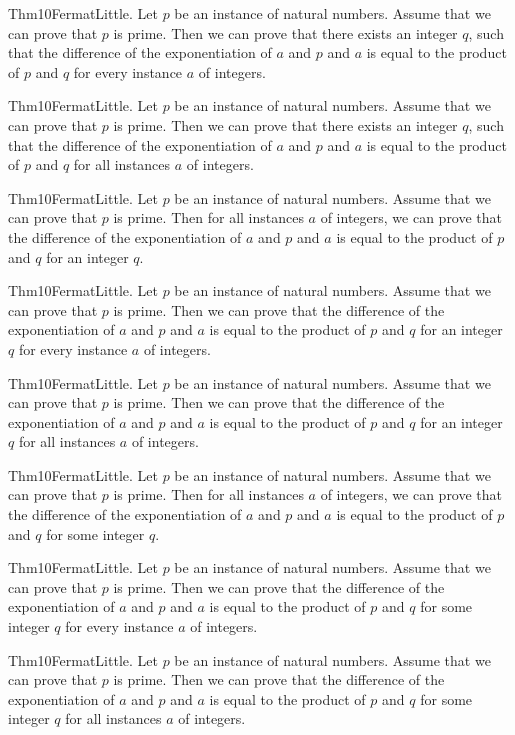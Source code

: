 \documentclass{article}
\begin{document}
Thm10FermatLittle. Let $p$ be an instance of natural numbers. Assume that we can prove that $p$ is prime. Then we can prove that there exists an integer $q$, such that the difference of the exponentiation of $a$ and $p$ and $a$ is equal to the product of $p$ and $q$ for every instance $a$ of integers.

Thm10FermatLittle. Let $p$ be an instance of natural numbers. Assume that we can prove that $p$ is prime. Then we can prove that there exists an integer $q$, such that the difference of the exponentiation of $a$ and $p$ and $a$ is equal to the product of $p$ and $q$ for all instances $a$ of integers.

Thm10FermatLittle. Let $p$ be an instance of natural numbers. Assume that we can prove that $p$ is prime. Then for all instances $a$ of integers, we can prove that the difference of the exponentiation of $a$ and $p$ and $a$ is equal to the product of $p$ and $q$ for an integer $q$.

Thm10FermatLittle. Let $p$ be an instance of natural numbers. Assume that we can prove that $p$ is prime. Then we can prove that the difference of the exponentiation of $a$ and $p$ and $a$ is equal to the product of $p$ and $q$ for an integer $q$ for every instance $a$ of integers.

Thm10FermatLittle. Let $p$ be an instance of natural numbers. Assume that we can prove that $p$ is prime. Then we can prove that the difference of the exponentiation of $a$ and $p$ and $a$ is equal to the product of $p$ and $q$ for an integer $q$ for all instances $a$ of integers.

Thm10FermatLittle. Let $p$ be an instance of natural numbers. Assume that we can prove that $p$ is prime. Then for all instances $a$ of integers, we can prove that the difference of the exponentiation of $a$ and $p$ and $a$ is equal to the product of $p$ and $q$ for some integer $q$.

Thm10FermatLittle. Let $p$ be an instance of natural numbers. Assume that we can prove that $p$ is prime. Then we can prove that the difference of the exponentiation of $a$ and $p$ and $a$ is equal to the product of $p$ and $q$ for some integer $q$ for every instance $a$ of integers.

Thm10FermatLittle. Let $p$ be an instance of natural numbers. Assume that we can prove that $p$ is prime. Then we can prove that the difference of the exponentiation of $a$ and $p$ and $a$ is equal to the product of $p$ and $q$ for some integer $q$ for all instances $a$ of integers.
\end{document}
